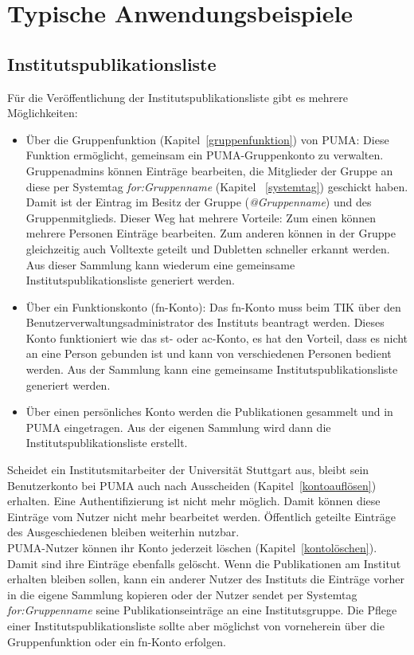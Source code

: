 \chapter{Typische Anwendungsbeispiele}

\section{Institutspublikationsliste}
Für die Veröffentlichung der Institutspublikationsliste gibt es mehrere Möglichkeiten:
\begin{itemize}
\item Über die Gruppenfunktion (Kapitel~\ref{gruppenfunktion}) von PUMA: Diese Funktion ermöglicht, gemeinsam ein PUMA-Gruppenkonto zu verwalten. Gruppenadmins können Einträge bearbeiten, die Mitglieder der Gruppe an diese per Systemtag \textit{for:Gruppenname} (Kapitel ~\ref{systemtag}) geschickt haben. Damit ist der Eintrag im Besitz der Gruppe (\textit{@Gruppenname}) und des Gruppenmitglieds. Dieser Weg hat mehrere Vorteile: Zum einen können mehrere Personen Einträge bearbeiten. Zum anderen können in der Gruppe gleichzeitig auch Volltexte geteilt und Dubletten schneller erkannt werden. Aus dieser  Sammlung kann wiederum eine gemeinsame Institutspublikationsliste generiert werden.
\item Über ein Funktionskonto (fn-Konto): Das fn-Konto muss beim TIK über den Benutzerverwaltungsadministrator des Instituts beantragt werden. Dieses Konto funktioniert wie das st- oder ac-Konto, es hat den Vorteil, dass es nicht an eine Person gebunden ist und kann von verschiedenen Personen bedient werden. Aus der Sammlung kann eine gemeinsame Institutspublikationsliste generiert werden.
\item Über einen persönliches Konto werden die Publikationen gesammelt und in PUMA eingetragen. Aus der eigenen Sammlung wird dann die Institutspublikationsliste erstellt.
\end{itemize}
Scheidet ein Institutsmitarbeiter der Universität Stuttgart aus, bleibt sein Benutzerkonto bei PUMA auch nach Ausscheiden (Kapitel~\ref{kontoauflösen}) erhalten. Eine Authentifizierung ist nicht mehr möglich. Damit können diese Einträge vom Nutzer nicht mehr bearbeitet werden. Öffentlich geteilte Einträge des Ausgeschiedenen bleiben weiterhin nutzbar.\\
PUMA-Nutzer können ihr Konto jederzeit löschen (Kapitel~\ref{kontolöschen}). Damit sind ihre Einträge ebenfalls gelöscht. Wenn die Publikationen am Institut erhalten bleiben sollen, kann ein anderer Nutzer des Instituts die Einträge vorher in die eigene Sammlung kopieren oder der Nutzer sendet per Systemtag \textit{for:Gruppenname} seine Publikationseinträge an eine Institutsgruppe. Die Pflege einer Institutspublikationsliste sollte aber möglichst von vorneherein über die Gruppenfunktion oder ein fn-Konto erfolgen.

